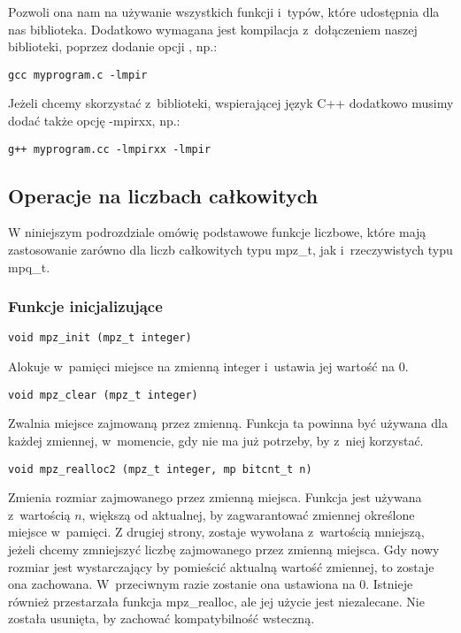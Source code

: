 Pozwoli ona nam na używanie wszystkich funkcji i~typów, które udostępnia dla nas biblioteka. Dodatkowo wymagana jest kompilacja z~dołączeniem naszej biblioteki, poprzez dodanie opcji , np.:
\begin{lstlisting}
gcc myprogram.c -lmpir
\end{lstlisting}

Jeżeli chcemy skorzystać z~biblioteki, wspierającej język C++ dodatkowo musimy dodać także opcję -mpirxx, np.:
\begin{lstlisting}
g++ myprogram.cc -lmpirxx -lmpir
\end{lstlisting}

\subsection{Operacje na liczbach całkowitych}
W niniejszym podrozdziale omówię podstawowe funkcje liczbowe, które mają zastosowanie zarówno dla liczb całkowitych typu mpz\_t, jak i~rzeczywistych typu mpq\_t.

\subsubsection{Funkcje inicjalizujące}
\begin{lstlisting}
void mpz_init (mpz_t integer)
\end{lstlisting}

Alokuje w~pamięci miejsce na zmienną integer i~ustawia jej wartość na $0$.

\begin{lstlisting}
void mpz_clear (mpz_t integer)
\end{lstlisting}

Zwalnia miejsce zajmowaną przez zmienną. Funkcja ta powinna być używana dla każdej zmiennej, w~momencie, gdy nie ma już potrzeby, by z~niej korzystać.

\begin{lstlisting}
void mpz_realloc2 (mpz_t integer, mp bitcnt_t n)
\end{lstlisting}

Zmienia rozmiar zajmowanego przez zmienną miejsca. Funkcja jest używana z~wartością $n$, większą od aktualnej, by zagwarantować zmiennej określone miejsce w~pamięci. Z drugiej strony, zostaje wywołana z~wartością mniejszą, jeżeli chcemy zmniejszyć liczbę zajmowanego przez zmienną miejsca. Gdy nowy rozmiar jest wystarczający by pomieścić aktualną wartość zmiennej, to zostaje ona zachowana. W~przeciwnym razie zostanie ona ustawiona na $0$. Istnieje również przestarzała funkcja mpz\_realloc, ale jej użycie jest niezalecane. Nie została usunięta, by zachować kompatybilność wsteczną.

